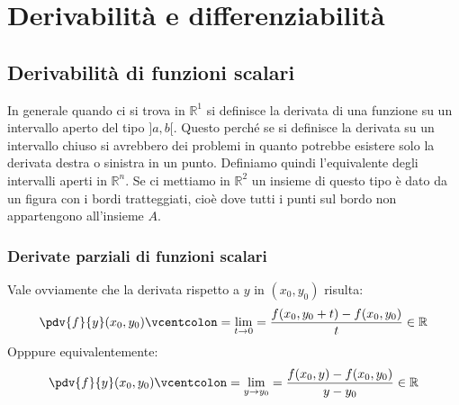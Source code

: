 \section{Derivabilità e differenziabilità}

\subsection{Derivabilità di funzioni scalari}
In generale quando ci si trova in $\mathbb{R}^1$ si definisce la derivata di una funzione su un intervallo aperto del tipo $]a, b[$. Questo perché se si definisce la derivata su un intervallo chiuso si avrebbero dei problemi in quanto potrebbe esistere solo la derivata destra o sinistra in un punto. Definiamo quindi l'equivalente degli intervalli aperti in $\mathbb{R}^n$.
Se ci mettiamo in $\mathbb{R}^2$ un insieme di questo tipo è dato da un figura con i bordi tratteggiati, cioè dove tutti i punti sul bordo non appartengono all'insieme $A$. %

\subsubsection{Derivate parziali di funzioni scalari}
Vale ovviamente che la derivata rispetto a $y$ in $(x_0, y_0)$ risulta:
\begin{equation*}
		\pdv{f}{y} (x_0, y_0) \vcentcolon = \lim_{t \to 0} = \dfrac{f(x_0, y_0 + t) - f(x_0, y_0)}{t} \in \mathbb{R}
\end{equation*}
Opppure equivalentemente:
\begin{equation*}
	\pdv{f}{y} (x_0, y_0) \vcentcolon = \lim_{y \to y_0} = \dfrac{f(x_0, y) - f(x_0, y_0)}{y - y_0} \in \mathbb{R}
\end{equation*}

